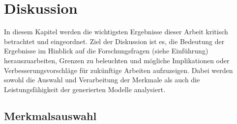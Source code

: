 \section{Diskussion}

In diesem Kapitel werden die wichtigsten Ergebnisse dieser Arbeit kritisch betrachtet und eingeordnet. Ziel der Diskussion ist es, die Bedeutung der Ergebnisse im Hinblick auf die Forschungsfragen (siehe Einführung) herauszuarbeiten, Grenzen zu beleuchten und mögliche Implikationen oder Verbesserungsvorschläge für zukünftige Arbeiten aufzuzeigen. Dabei werden sowohl die Auswahl und Verarbeitung der Merkmale als auch die Leistungsfähigkeit der generierten Modelle analysiert.

\subsection{Merkmalsauswahl}

